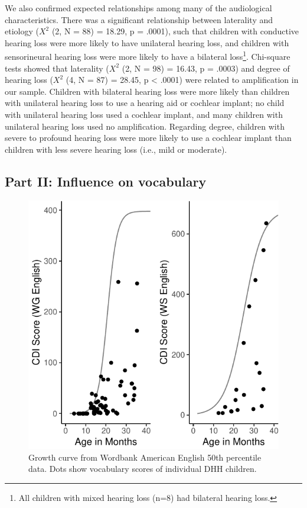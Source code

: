 \documentclass[english,man]{apa6}
\begin{document}
We also confirmed expected relationships among many of the audiological characteristics. There was a significant relationship between laterality and etiology (\(X^2\) (2, N = 88) = 18.29, p = .0001), such that children with conductive hearing loss were more likely to have unilateral hearing loss, and children with sensorineural hearing loss were more likely to have a bilateral loss\footnote{All children with mixed hearing loss (n=8) had bilateral hearing loss.}. Chi-square tests showed that laterality (\(X^2\) (2, N = 98) = 16.43, p = .0003) and degree of hearing loss (\(X^2\) (4, N = 87) = 28.45, p \textless{} .0001) were related to amplification in our sample. Children with bilateral hearing loss were more likely than children with unilateral hearing loss to use a hearing aid or cochlear implant; no child with unilateral hearing loss used a cochlear implant, and many children with unilateral hearing loss used no amplification. Regarding degree, children with severe to profound hearing loss were more likely to use a cochlear implant than children with less severe hearing loss (i.e., mild or moderate).

\hypertarget{part-ii-influence-on-vocabulary}{%
\subsection{Part II: Influence on vocabulary}\label{part-ii-influence-on-vocabulary}}

\begin{figure}
\centering
\includegraphics{ELSSP_paper_files/figure-latex/english-curves-1.pdf}
\caption{\label{fig:english-curves}Growth curve from Wordbank American English 50th percentile data. Dots show vocabulary scores of individual DHH children.}
\end{figure}
\end{document}
